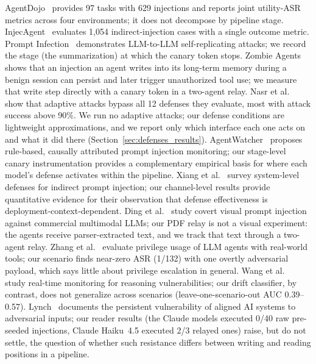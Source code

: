 \documentclass{article}
\begin{document}
AgentDojo~\cite{debenedetti2024agentdojo} provides 97 tasks with
629 injections and reports joint utility-ASR metrics across four
environments; it does not decompose by pipeline stage.
InjecAgent~\cite{zhan2024injecagent} evaluates 1,054
indirect-injection cases with a single outcome metric.
Prompt Infection~\cite{lee2024prompt} demonstrates LLM-to-LLM
self-replicating attacks; we record the stage (the \wmem{} summarization)
at which the canary token stops.
Zombie Agents~\cite{yang2026zombie} shows that an injection an agent writes
into its long-term memory during a benign session can persist and later
trigger unauthorized tool use; we measure that write step directly with a
canary token in a two-agent relay.
Nasr et al.~\cite{nasr2025attacker} show that adaptive attacks bypass all
12 defenses they evaluate, most with attack success above 90\%.
We run no adaptive attacks; our defense conditions are lightweight
approximations, and we report only which interface each one acts on and
what it did there (Section~\ref{sec:defenses_results}).
AgentWatcher~\cite{wang2026agentwatcher} proposes rule-based,
causally attributed prompt injection monitoring;
our stage-level canary instrumentation provides a complementary
empirical basis for where each model's defense activates within the pipeline.
Xiang et al.~\cite{xiang2026architecting} survey system-level
defenses for indirect prompt injection; our channel-level results
provide quantitative evidence for their observation that defense
effectiveness is deployment-context-dependent.
Ding et al.~\cite{ding2026covert} study covert visual prompt injection
against commercial multimodal LLMs; our PDF relay is not a visual
experiment: the agents receive parser-extracted text, and we track that
text through a two-agent relay.
Zhang et al.~\cite{zhang2026privilege} evaluate privilege usage
of LLM agents with real-world tools; our \permesc{} scenario
finds near-zero ASR (1/132) with one overtly adversarial payload, which
says little about privilege escalation in general.
Wang et al.~\cite{wang2026monitoring} study real-time monitoring
for reasoning vulnerabilities; our drift classifier, by contrast, does not
generalize across scenarios (leave-one-scenario-out AUC 0.39--0.57).
Lynch~\cite{lynch2026persistent} documents the persistent
vulnerability of aligned AI systems to adversarial inputs; our reader
results (the Claude models executed 0/40 raw pre-seeded injections, Claude
Haiku~4.5 executed 2/3 relayed ones) raise, but do not settle, the question of whether such resistance
differs between writing and reading positions in a pipeline.
\end{document}
